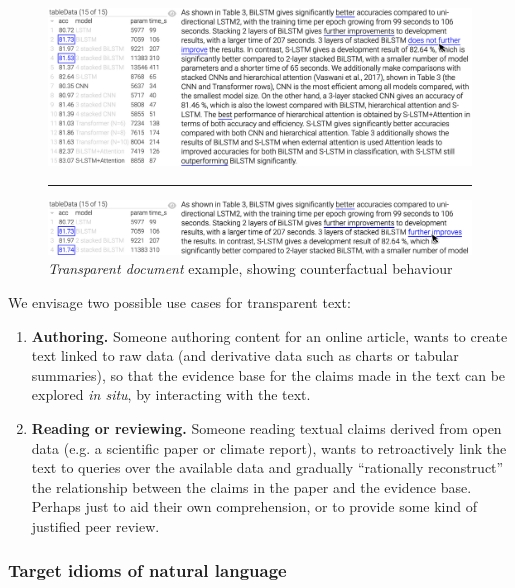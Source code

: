 \begin{figure}%
    \centering
    \includegraphics[width=\linewidth]{fig/scigen-1805.02474v1-10-with-pointer.png}
    \vspace{1mm}
    \hrule
    \includegraphics[width=\linewidth]{fig/scigen-1805.02474v1-10-counterfactual-with-pointer.png}
    \caption{\emph{Transparent document} example, showing counterfactual behaviour}\label{fig:scigen-example-website}
\end{figure}

We envisage two possible use cases for transparent text:

\begin{enumerate}
\item \textbf{Authoring.} Someone authoring content for an online article, wants to create text
linked to raw data (and derivative data such as charts or tabular summaries), so that the evidence base for
the claims made in the text can be explored \emph{in situ}, by interacting with the text.

\item \textbf{Reading or reviewing.} Someone reading textual claims derived from open data (e.g. a
scientific paper or climate report), wants to retroactively link the text to queries over the available data
and gradually ``rationally reconstruct'' the relationship between the claims in the paper and the evidence
base. Perhaps just to aid their own comprehension, or to provide some kind of justified peer review.
\end{enumerate}



\subsubsection{Target idioms of natural language}

